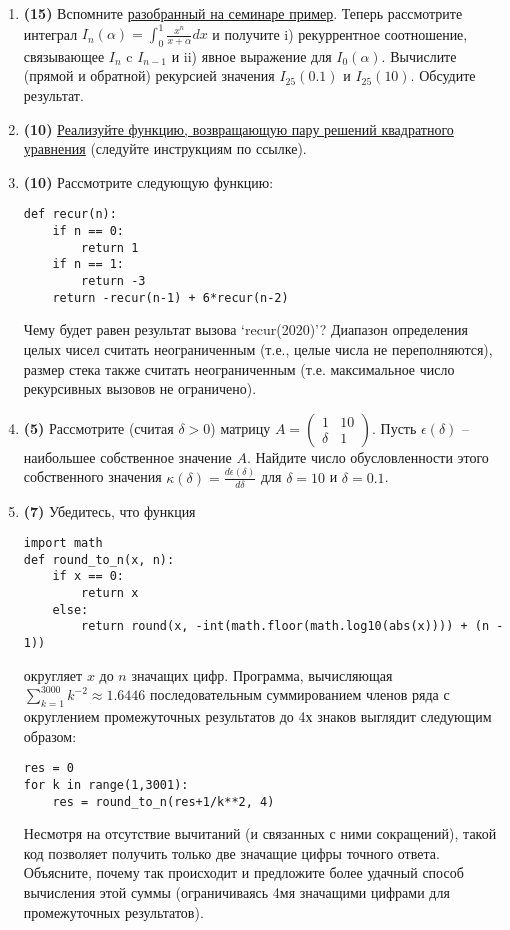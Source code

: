 \documentclass[10pt]{article}
\begin{document}
\begin{enumerate}
\item \textbf{(15)} Вспомните \href{https://github.com/ev-br/CP2020/blob/master/week_0_recurrence.ipynb}{разобранный на семинаре пример}. Теперь рассмотрите интеграл $I_n(\alpha) = \int_0^1 \frac{x^n}{x+\alpha} dx$ и получите i) рекуррентное соотношение, связывающее $I_{n}$ c $I_{n-1}$ и ii) явное выражение для $I_0(\alpha)$. Вычислите (прямой и обратной) рекурсией значения $I_{25}(0.1)$ и $I_{25}(10)$. Обсудите результат.
\item \textbf{(10)} \href{https://github.com/ev-br/CP2020/blob/master/week_1_quadratic.ipynb}{Реализуйте функцию, возвращающую пару решений квадратного уравнения} (следуйте инструкциям по ссылке).
\item \textbf{(10)} Рассмотрите следующую функцию:
\lstset{language=Python}
\lstset{frame=lines}
\lstset{basicstyle=\ttfamily}
\begin{lstlisting}
def recur(n):
    if n == 0:
        return 1
    if n == 1:
        return -3
    return -recur(n-1) + 6*recur(n-2)
\end{lstlisting}

Чему будет равен результат вызова `recur(2020)'? Диапазон определения целых чисел считать неограниченным (т.е., целые числа не переполняются), размер стека также считать неограниченным (т.е. максимальное число рекурсивных вызовов не ограничено).
\item \textbf{(5)} Рассмотрите (считая $\delta>0$) матрицу $A=\begin{pmatrix}
1 & 10 \\
\delta &1 
\end{pmatrix}$. Пусть $\epsilon(\delta)$ -- наибольшее собственное значение $A$. Найдите число обусловленности этого собственного значения $\kappa(\delta)=\frac{d\epsilon(\delta)}{d\delta}$ для $\delta=10$ и $\delta=0.1$.

\item \textbf{(7)} Убедитесь, что функция
\lstset{language=Python}
\lstset{frame=lines}
\lstset{basicstyle=\ttfamily}
\begin{lstlisting}
import math
def round_to_n(x, n): 
    if x == 0:
        return x
    else:
        return round(x, -int(math.floor(math.log10(abs(x)))) + (n - 1))
\end{lstlisting}
округляет $x$ до $n$ значащих цифр.
Программа, вычисляющая $\sum_{k=1}^{3000}k^{-2}\approx 1.6446$ последовательным суммированием членов ряда с округлением промежуточных результатов до 4х знаков выглядит следующим образом:
\lstset{language=Python}
\lstset{frame=lines}
\lstset{basicstyle=\ttfamily}
\begin{lstlisting}
res = 0
for k in range(1,3001):
    res = round_to_n(res+1/k**2, 4)
\end{lstlisting}
Несмотря на отсутствие вычитаний (и связанных с ними сокращений), такой код позволяет получить только две значащие цифры точного ответа. Объясните, почему так происходит и предложите более удачный способ вычисления этой суммы (ограничиваясь 4мя значащими цифрами для промежуточных результатов).
\end{enumerate}
\end{document}
